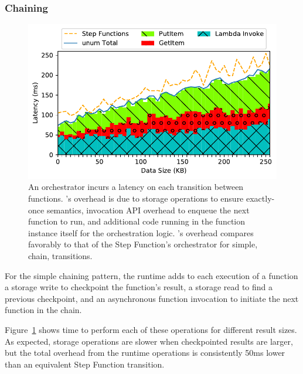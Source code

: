 \subsubsection{Chaining}

\begin{figure}[t]
  \centering
  \includegraphics[width=\columnwidth]{figures/TotalAdditionalLatencyNBreakdown.pdf}
  \caption{An orchestrator incurs a latency on each transition between
functions. \name{}'s overhead is due to storage operations to ensure
exactly-once semantics, invocation API overhead to enqueue the next function to
run, and additional code running in the function instance itself for the
orchestration logic. \name{}'s overhead compares favorably to that of the Step
Function's orchestrator for simple, chain, transitions.}
  \label{fig:single-transition-latency-breakdown}
\end{figure}

For the simple chaining pattern, the \name{} runtime adds to each execution of a
function a storage write to checkpoint the function's result, a storage read to
find a previous checkpoint, and an asynchronous function invocation to initiate
the next function in the chain.

Figure~\ref{fig:single-transition-latency-breakdown} shows time to perform each
of these operations for different result sizes. As expected, storage operations
are slower when checkpointed results are larger, but the total overhead from the
\name{} runtime operations is consistently 50ms lower than an equivalent Step
Function transition.


